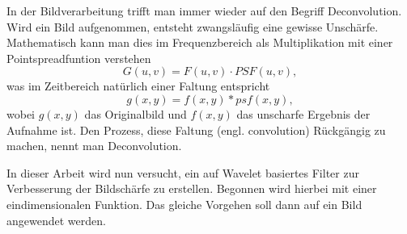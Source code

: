 In der Bildverarbeitung trifft man immer wieder auf den Begriff Deconvolution.
Wird ein Bild aufgenommen, entsteht zwangsläufig eine gewisse Unschärfe.
Mathematisch kann man dies im Frequenzbereich als Multiplikation mit einer Pointspreadfuntion \cite{buch:image_processing} verstehen
$$G(u,v)=F(u,v)\cdot PSF(u,v),$$
was im Zeitbereich natürlich einer Faltung entspricht
$$g(x,y) = f(x,y)*psf(x,y),$$
wobei $g(x,y)$ das Originalbild und $f(x,y)$ das unscharfe Ergebnis der Aufnahme ist.
Den Prozess, diese Faltung (engl. convolution) Rückgängig zu machen, nennt man Deconvolution.

In dieser Arbeit wird nun versucht, ein auf Wavelet basiertes Filter zur Verbesserung der Bildschärfe zu erstellen. Begonnen wird hierbei mit einer eindimensionalen Funktion. Das gleiche Vorgehen soll dann auf ein Bild angewendet werden.

